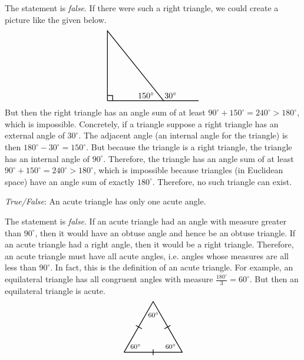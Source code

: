 \documentclass[11pt,letterpaper]{article}
\begin{document}
\sol The statement is \textit{false}. If there were such a right triangle, we could create a picture like the given below.
	\[
	\begin{tikzpicture}[scale=1.5]
	\draw[line width= 0.03cm] (0,0) -- (0,2) -- (1.6,0) -- (0,0);
	\draw[line width= 0.03cm] (0,0.15) -- (0.15,0.15) -- (0.15,0);
	\draw[line width= 0.03cm] (1.6,0) -- (2.6,0);
	\node at (1.8,0.15) {$30^\circ$};
	\node at (1.1,0.15) {$150^\circ$};
	\end{tikzpicture}
	\]
But then the right triangle has an angle sum of at least $90^\circ + 150^\circ= 240^\circ > 180^\circ$, which is impossible. Concretely, if a triangle suppose a right triangle has an external angle of $30^\circ$. The adjacent angle (an internal angle for the triangle) is then $180^\circ - 30^\circ= 150^\circ$. But because the triangle is a right triangle, the triangle has an internal angle of $90^\circ$. Therefore, the triangle has an angle sum of at least $90^\circ + 150^\circ= 240^\circ > 180^\circ$, which is impossible because triangles (in Euclidean space) have an angle sum of exactly $180^\circ$. Therefore, no such triangle can exist. 



\newpage



\quizsol \textit{True/False}: An acute triangle has only one acute angle. \pspace

\sol The statement is \textit{false}. If an acute triangle had an angle with measure greater than $90^\circ$, then it would have an obtuse angle and hence be an obtuse triangle. If an acute triangle had a right angle, then it would be a right triangle. Therefore, an acute triangle must have all acute angles, i.e. angles whose measures are all less than $90^\circ$. In fact, this is the definition of an acute triangle. For example, an equilateral triangle has all congruent angles with measure $\frac{180^\circ}{3}= 60^\circ$. But then an equilateral triangle is acute. 
	\[
	\begin{tikzpicture}[scale=2.5]
	\draw[line width= 0.03cm] (0,0) -- (1,0) -- (0.5,0.866) -- (0,0);
	\draw[line width= 0.03cm] (0.5,-0.05) -- (0.5,0.05);
	\draw[line width= 0.03cm] (0.69282, 0.4) -- (0.796743, 0.46);
	\draw[line width= 0.03cm] (0.30718, 0.4) -- (0.203257, 0.46);
	\node at (0.2,0.1) {\footnotesize$60^\circ$};
	\node at (0.8,0.1) {\footnotesize$60^\circ$};
	\node at (0.505,0.64) {\footnotesize$60^\circ$};
	\end{tikzpicture}
	\] \pvspace{1.3cm}
\end{document}
